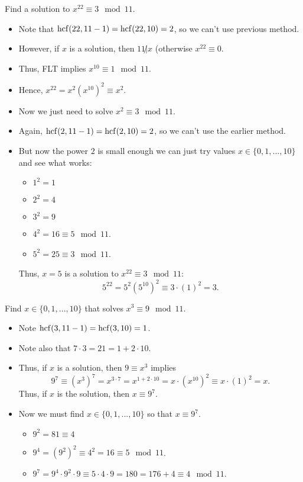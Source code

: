 \documentclass[11pt,dvipsnames]{book}
\def\hcf{{\rm hcf}}
\numberwithin{equation}{section} %
\numberwithin{figure}{section} %
\numberwithin{table}{section} %
\begin{document}
\begin{exercise}
\begin{example}
Find a solution to $x^{22}\equiv 3 \mod 11$.  
\end{example}

\begin{itemize}
\item Note that $\hcf(22,11-1)=\hcf(22,10)=2$, so we can't use previous method.  
\item However, if $x$ is a solution, then $11\not|x$   (otherwise $x^{22}\equiv 0$.  
\item Thus, FLT implies $x^{10}\equiv 1 \mod 11$.  
\item Hence, $x^{22}=x^{2}(x^{10})^{2}  \equiv x^{2}$.  
\item Now we just need to solve $x^{2}\equiv 3 \mod 11$.  
\item Again, $\hcf(2,11-1)=\hcf(2,10)=2$, so we can't use the earlier method.  
\item But now the power $2$ is small enough we can just try values $x\in \{0,1,...,10\}$ and see what works: 

\begin{itemize}
\item $1^{2}=1$ 
\item $2^{2}=4$ 
\item $3^{2}=9$ 
\item $4^{2}=16\equiv 5 \mod 11$.  
\item $5^{2}=25\equiv 3\mod 11$.  
\end{itemize}
Thus, $x=5$ is a solution to $x^{22}\equiv 3 \mod 11$:  
\[
5^{22}=5^{2}(5^{10})^{2}\equiv 3\cdot (1)^{2}=3.
\]

\end{itemize}

\begin{example}
 Find $x\in\{0,1,...,10\}$ that solves $x^{3}\equiv 9 \mod 11$.  
\end{example}

\begin{itemize}
\item Note $\hcf(3,11-1)=\hcf(3,10)=1$.  
\item Note also that $7\cdot 3 = 21=1+2\cdot 10$.   
\item Thus, if $x$ is a solution, then $9\equiv x^{3}$ implies  
\[
9^{7}\equiv (x^{3})^{7}  
=x^{3\cdot 7}  
 =x^{1+2\cdot 10}   
  =x\cdot (x^{10})^{2}  
  \equiv x\cdot(1)^{2}  
  =x.\]
  Thus, if $x$ is the solution, then $x\equiv 9^{7}$.   
  \item Now we must find $x\in \{0,1,...,10\}$ so that $x\equiv 9^{7}$.   
  \begin{itemize}
  \item $9^{2}=81  \equiv 4$
  \item $9^{4}=(9^{2})^{2}  \equiv 4^{2}  =16\equiv 5\mod 11$.   
  \item $9^{7}=9^{4}\cdot 9^{2}\cdot 9 \equiv 5\cdot 4\cdot 9 =180 =176+4\equiv 4\mod 11$. 
  \end{itemize}
    

\end{itemize}
\end{exercise}
\end{document}
